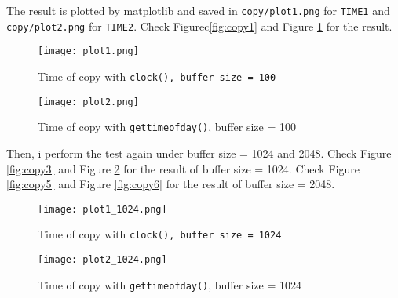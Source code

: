 The result is plotted by matplotlib and saved in \texttt{copy/plot1.png} for \texttt{TIME1} and \texttt{copy/plot2.png} for \texttt{TIME2}. 
Check Figurec\ref{fig:copy1} and Figure \ref{fig:copy2} for the result.


\begin{figure}[!h]
    \begin{minipage}{0.45\textwidth}
        \centering
        \texttt{[image: plot1.png]}
        \caption{Time of copy with \texttt{clock(), buffer size = 100}}
        \label{fig:copy1}
    \end{minipage}\hfill
    \begin{minipage}{0.45\textwidth}
        \centering
        \texttt{[image: plot2.png]}
        \caption{Time of copy with \texttt{gettimeofday()}, buffer size = 100}
        \label{fig:copy2}
    \end{minipage}
\end{figure}

Then, i perform the test again under buffer size = 1024 and 2048.
Check Figure \ref{fig:copy3} and Figure \ref{fig:copy4} for the result of buffer size = 1024.
Check Figure \ref{fig:copy5} and Figure \ref{fig:copy6} for the result of buffer size = 2048.

\begin{figure}[!h]
    \begin{minipage}{0.45\textwidth}
        \centering
        \texttt{[image: plot1\_1024.png]}
        \caption{Time of copy with \texttt{clock(), buffer size = 1024}}
        \label{fig:cop3}
    \end{minipage}\hfill
    \begin{minipage}{0.45\textwidth}
        \centering
        \texttt{[image: plot2\_1024.png]}
        \caption{Time of copy with \texttt{gettimeofday()}, buffer size = 1024}
        \label{fig:copy4}
    \end{minipage}
\end{figure}

